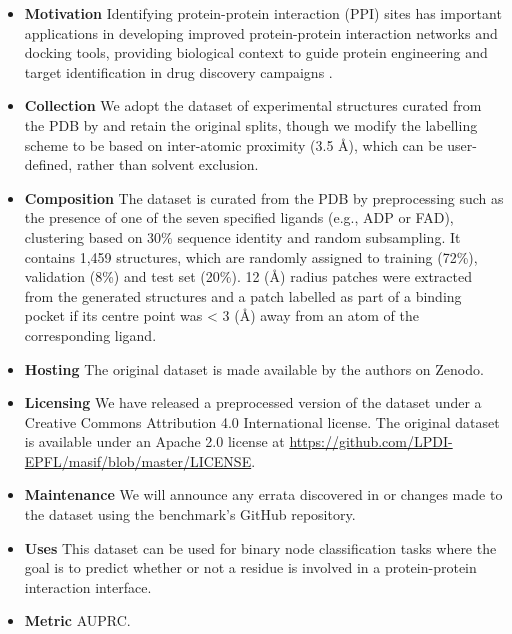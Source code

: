 \begin{itemize}
    \item \textbf{Motivation} Identifying protein-protein interaction (PPI) sites has important applications in developing improved protein-protein interaction networks and docking tools, providing biological context to guide protein engineering and target identification in drug discovery campaigns \citep{Jamasb2021}.
    \item \textbf{Collection} We adopt the dataset of experimental structures curated from the PDB by \citet{gainza2020deciphering} and retain the original splits, though we modify the labelling scheme to be based on inter-atomic proximity (3.5 \AA), which can be user-defined, rather than solvent exclusion.
    \item \textbf{Composition} The dataset is curated from the PDB by preprocessing such as the presence of one of the seven specified ligands (e.g., ADP or FAD), clustering based on 30\% sequence identity and random subsampling. It contains 1,459 structures, which are randomly assigned to training (72\%), validation (8\%) and test set (20\%). 12 (\AA) radius patches were extracted from the generated structures and a patch labelled as part of a binding pocket if its centre point was < 3 (\AA) away from an atom of the corresponding ligand.
    \item \textbf{Hosting} %
    The original dataset is made available by the authors on Zenodo.%
    \item \textbf{Licensing} We have released a preprocessed version of the dataset under a Creative Commons Attribution 4.0 International license. The original dataset is available under an Apache 2.0 license at \url{https://github.com/LPDI-EPFL/masif/blob/master/LICENSE}.
    \item \textbf{Maintenance} We will announce any errata discovered in or changes made to the dataset using the benchmark's GitHub repository.%
    \item \textbf{Uses} This dataset can be used for binary node classification tasks where the goal is to predict whether or not a residue is involved in a protein-protein interaction interface.
    \item \textbf{Metric} AUPRC.
\end{itemize}

